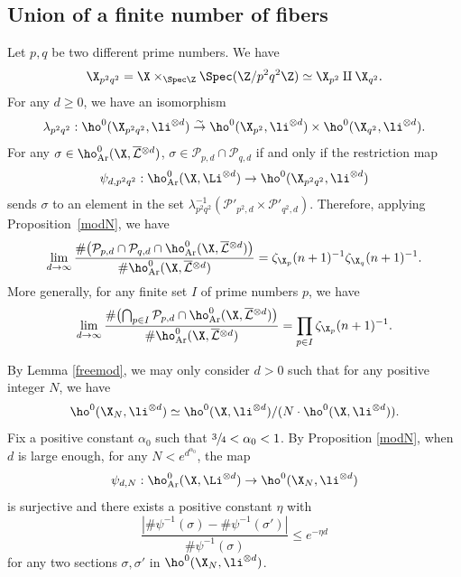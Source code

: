 \subsection{Union of a finite number of fibers}

Let $p,q$ be two different prime numbers. We have
\[
\X_{p^2q^2} =\X\times_{\Spec \Z}\Spec(\Z/p^2q^2\Z)\simeq \X_{p^2}\amalg \X_{q^2}.
\]
For any $d\geq 0$, we have an isomorphism
\[
\lambda_{p^2q^2}: \ho^0(\X_{p^2q^2},\li^{\otimes d}) \stackrel{\sim}\to \ho^0(\X_{p^2},\li^{\otimes d}) \times \ho^0(\X_{q^2},\li^{\otimes d}).
\]
For any $\sigma \in \ho^0_{\mathrm{Ar}}(\X, \overline{\mathcal{L}}{}^{\otimes d})$, $\sigma\in \mathcal{P}_{p,d}\cap \mathcal{P}_{q,d}$ if and only if the restriction map
\[
\psi_{d,p^2q^2}: \ho^0_{\mathrm{Ar}}(\X,\Li^{\otimes d}) \to \ho^0(\X_{p^2q^2},\li^{\otimes d})
\]
sends $\sigma$ to an element in the set $\lambda^{-1}_{p^2q^2}(\mathcal{P}'_{p^2,d}\times \mathcal{P}'_{q^2,d})$. Therefore, applying Proposition~\ref{modN}, we have
\[
\lim_{d\to \infty}\frac{\#\bigl(\mathcal{P}_{p,d}\cap \mathcal{P}_{q,d}\cap \ho^0_{\mathrm{Ar}}(\X, \overline{\mathcal{L}}{}^{\otimes d})\bigr)}{\#\ho^0_{\mathrm{Ar}}(\X, \overline{\mathcal{L}}{}^{\otimes d})}=\zeta_{\X_p}(n+1)^{-1}\zeta_{\X_q}(n+1)^{-1}.
\]
More generally, for any finite set $I$ of prime numbers $p$, we have
\[
\lim_{d\to \infty}\frac{\#\bigl(\bigcap_{p\in I}\mathcal{P}_{p,d}\cap \ho^0_{\mathrm{Ar}}(\X, \overline{\mathcal{L}}{}^{\otimes d})\bigr)}{\#\ho^0_{\mathrm{Ar}}(\X, \overline{\mathcal{L}}{}^{\otimes d})}=\prod_{p\in I}\zeta_{\X_p}(n+1)^{-1}.
\]

By Lemma \ref{freemod}, we may only consider $d>0$ such that for any positive integer $N$, we have
\[
\ho^0(\X_N, \li^{\otimes d})\simeq \ho^0(\X, \li^{\otimes d})/(N\cdot\ho^0(\X, \li^{\otimes d})).
\]
Fix a positive constant $\alpha_0$ such that $\sfrac{3}{4}<\alpha_0<1$. By Proposition \ref{modN}, when $d$ is large enough, for any $N<e^{d^{\alpha_0}}$, the map
\[
\psi_{d,N}: \ho^0_{\mathrm{Ar}}(\X,\Li^{\otimes d}) \to \ho^0(\X_N,\li^{\otimes d})
\]
is surjective and there exists a positive constant $\eta$ with
\[
\frac{| \#\psi^{-1}(\sigma)- \#\psi^{-1}(\sigma') |}{\#\psi^{-1}(\sigma)}\leq e^{-\eta d}
\]
for any two sections $\sigma,\sigma'$ in $ \ho^0(\X_N,\li^{\otimes d})$.

